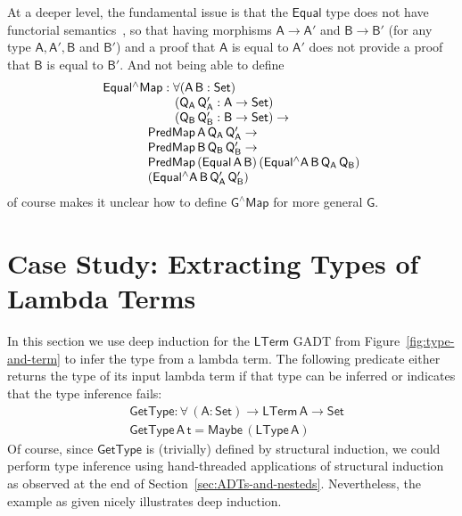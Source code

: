 \documentclass[sigplan,10pt,anonymous,review]{acmart}
\begin{document}
At a deeper level, the fundamental issue is that the $\mathsf{Equal}$
type does not have functorial semantics~\cite{jg21}, so that having
morphisms $\mathsf{A \to A'}$ and $\mathsf{B \to B'}$ (for any type
$\mathsf{A, A', B}$ and $\mathsf{B'}$) and a proof that $\mathsf{A}$
is equal to $\mathsf{A'}$ does not provide a proof that $\mathsf{B}$
is equal to $\mathsf{B'}$. And not being able to define
\[\begin{array}{l}
\mathsf{Equal^\wedge Map : \forall (A\, B : Set)}\\
\hspace*{0.8in}\mathsf{(Q_A\, Q_A' : A \to Set)}\\
\hspace*{0.8in}\mathsf{(Q_B\, Q_B' : B \to Set) \to}\\
\hspace*{0.5in}\mathsf{PredMap\,A\,Q_A\,Q_A' \to}\\
\hspace*{0.5in}\mathsf{PredMap\,B\,Q_B\,Q_B' \to}\\
\hspace*{0.5in}\mathsf{PredMap\,(Equal\,A\,B)\,(Equal^\wedge
  A\,B\,Q_A\,Q_B)}\\
\hspace*{0.5in}\mathsf{(Equal^\wedge A\,B\,Q_A'\,Q_B')}
\end{array}\]
of course makes it unclear how to define $\mathsf{G^\wedge Map}$ for
more general $\mathsf{G}$.

\section{Case Study: Extracting Types of Lambda Terms}\label{sec:app}

In this section we use deep induction for the $\mathsf{LTerm}$ GADT
from Figure~\ref{fig:type-and-term} to infer the type from a lambda
term. The following predicate either returns the type of its input
lambda term if that type can be inferred or indicates that the type
inference fails:
\begin{align*}
  &\mathsf{GetType : \forall \, (A : Set) \to LTerm\,A \to Set} \\
  &\mathsf{GetType \,A \,t = Maybe \, (LType \, A)}
\end{align*}
Of course, since $\mathsf{GetType}$ is (trivially) defined by
structural induction, we could perform type inference using
hand-threaded applications of structural induction as observed at the
end of Section~\ref{sec:ADTs-and-nesteds}. Nevertheless, the example
as given nicely illustrates deep induction.
\end{document}
